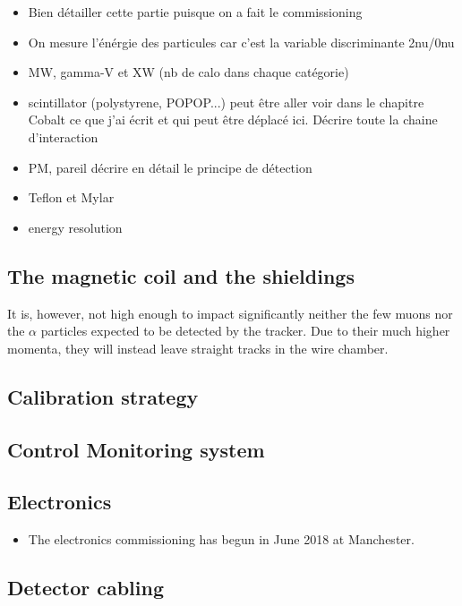 \begin{itemize}
\item Bien détailler cette partie puisque on a fait le commissioning
\item On mesure l'énérgie des particules car c'est la variable discriminante 2nu/0nu
\item MW, gamma-V et XW (nb de calo dans chaque catégorie)
\item scintillator (polystyrene, POPOP...) peut être aller voir dans le chapitre Cobalt ce que j'ai écrit et qui peut être déplacé ici. Décrire toute la chaine d'interaction
\item PM, pareil décrire en détail le principe de détection
\item Teflon et Mylar
\item energy resolution
\end{itemize}

\subsection{The magnetic coil and the shieldings}

\label{sec:magnetic_field}

It is, however, not high enough to impact significantly neither the few muons nor the $\alpha$ particles expected to be detected by the tracker.
Due to their much higher momenta, they will instead leave straight tracks in the wire chamber.

\subsection{Calibration strategy}
\label{subsec:calib}

\subsection{Control Monitoring system}

\subsection{Electronics}
\begin{itemize}
\item The electronics commissioning has begun in June 2018 at Manchester.
\end{itemize}


\subsection{Detector cabling}

